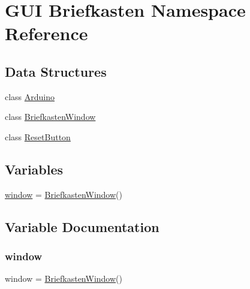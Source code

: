 \hypertarget{namespace_g_u_i_01_briefkasten}{}\section{G\+UI Briefkasten Namespace Reference}
\label{namespace_g_u_i_01_briefkasten}
\subsection*{Data Structures}
\begin{DoxyCompactItemize}
\item 
class \mbox{\hyperlink{class_g_u_i_01_briefkasten_1_1_arduino}{Arduino}}
\item 
class \mbox{\hyperlink{class_g_u_i_01_briefkasten_1_1_briefkasten_window}{Briefkasten\+Window}}
\item 
class \mbox{\hyperlink{class_g_u_i_01_briefkasten_1_1_reset_button}{Reset\+Button}}
\end{DoxyCompactItemize}
\subsection*{Variables}
\begin{DoxyCompactItemize}
\item 
\mbox{\hyperlink{namespace_g_u_i_01_briefkasten_a04a8a2bbfa9c15500892b8e5033d625b}{window}} = \mbox{\hyperlink{class_g_u_i_01_briefkasten_1_1_briefkasten_window}{Briefkasten\+Window}}()
\end{DoxyCompactItemize}


\subsection{Variable Documentation}
\mbox{\label{namespace_g_u_i_01_briefkasten_a04a8a2bbfa9c15500892b8e5033d625b}} 
\subsubsection{\texorpdfstring{window}{window}}
{\footnotesize\ttfamily window = \mbox{\hyperlink{class_g_u_i_01_briefkasten_1_1_briefkasten_window}{Briefkasten\+Window}}()}

